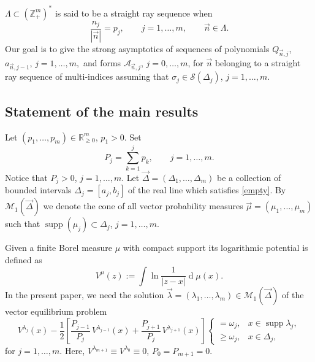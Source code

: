 \documentclass{amsart}
\numberwithin{equation}{section}
\theoremstyle{definition}
\DeclareMathOperator{\D}{d}        %
\DeclareMathOperator{\supp}{supp}  %
\newcommand{\ZZ}{\mathbb{Z}}      %
\newcommand{\RR}{\mathbb{R}}      %
\newcommand{\n}{\vec{n}}          %
\begin{document}
     $\Lambda \subset (\ZZ_+^m)^*$ is said to be a straight ray sequence when
    \begin{equation}
        \label{const_ray}
        \frac{n_j}{|\n|}= p_j, \qquad j=1,\ldots,m, \qquad   \n\in\Lambda.
    \end{equation}
    Our goal is to give the strong asymptotics of sequences  of polynomials $Q_{\n,j}$, $a_{\n,j-1}$, $j=1,\ldots,m,$ and forms $\mathcal{A}_{\n,j}$, $j=0,\ldots,m$, for $\n$ belonging to a straight  ray sequence of multi-indices assuming that $\sigma_j \in \mathcal{S}(\Delta_j)$, $j=1,\ldots,m$.

\subsection{Statement of the main results}

    Let $ (p_1,\ldots,p_m) \in \RR_{\geq 0}^m$, $p_1 > 0.$  Set
    \begin{equation}
        \label{Ps}
        P_j = \sum_{k=1}^{j}p_k, \qquad j=1,\ldots,m.
    \end{equation}
    Notice that $P_j > 0$, $j=1,\ldots,m$. Let $\vec{\Delta} = (\Delta_1,\ldots,\Delta_m)$ be a collection of bounded intervals  $\Delta_j=[a_j,b_j]$  of the real line which satisfies \eqref{empty}. By $\mathcal{M}_1(\vec{\Delta})$ we denote the cone of all vector probability measures   $\vec{\mu} = (\mu_1,\ldots,\mu_m)$ such that $\supp (\mu_j) \subset \Delta_j$,  $j=1,\ldots,m$.

    Given a finite Borel measure $\mu$ with compact support its logarithmic potential is defined as
    \[ V^\mu(z) := \int\ln\frac{1}{|z-x|}\D \mu (x).
    \]
    In the present paper, we need the solution $\vec{\lambda} = (\lambda_1,\ldots,\lambda_m)\in \mathcal{M}_1(\vec{\Delta})$ of the   vector equilibrium problem
    \begin{equation}
        \label{eq:vector}
        V^{\lambda_j}(x) - \frac{1}{2}\left[ \frac{P_{j-1}}{P_j}\,V^{\lambda_{j-1}}(x) +  \frac{P_{j+1}}{P_j}\,V^{\lambda_{j+1}}(x)\right]
        \begin{cases}
            =\omega_j, & x\in\supp \lambda_j,\\
            \geq \omega_j, & x\in \Delta_j,
        \end{cases}
    \end{equation}
    for $j=1,\ldots,m$. Here, $V^{\lambda_{m+1}}\equiv V^{\lambda_0} \equiv 0$, $P_0 = P_{m+1} = 0$.
\end{document}
